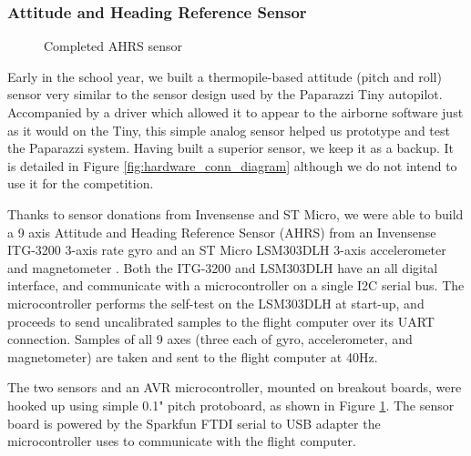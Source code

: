 \documentclass[pdftex,10pt,letter]{article}
\begin{document}
\subsubsection{Attitude and Heading Reference Sensor}
\begin{figure}
	\centering
	\caption{Completed AHRS sensor}
	\label{fig:ahrs_picture}
\end{figure}
Early in the school year, we built a thermopile-based attitude (pitch and roll) sensor very similar to the sensor design used by the Paparazzi Tiny autopilot. Accompanied by a driver which allowed it to appear to the airborne software just as it would on the Tiny, this simple analog sensor helped us prototype and test the Paparazzi system. Having built a superior sensor, we keep it as a backup. It is detailed in Figure \ref{fig:hardware_conn_diagram} although we do not intend to use it for the competition.

Thanks to sensor donations from Invensense and ST Micro, we were able to build a 9 axis Attitude and Heading Reference Sensor (AHRS) from an Invensense ITG-3200 3-axis rate gyro \cite{itg3200} and an ST Micro LSM303DLH 3-axis accelerometer and magnetometer \cite{lsm303dlh}. Both the ITG-3200 and LSM303DLH have an all digital interface, and communicate with a microcontroller on a single I2C \cite{i2c} serial bus. The microcontroller performs the self-test on the LSM303DLH at start-up, and proceeds to send uncalibrated samples to the flight computer over its UART connection. Samples of all 9 axes (three each of gyro, accelerometer, and magnetometer) are taken and sent to the flight computer at 40Hz.

The two sensors and an AVR microcontroller, mounted on breakout boards, were hooked up using simple 0.1" pitch protoboard, as shown in Figure \ref{fig:ahrs_picture}. The sensor board is powered by the Sparkfun FTDI serial to USB adapter \cite{sparkfun_ftdi} the microcontroller uses to communicate with the flight computer. 
\end{document}
